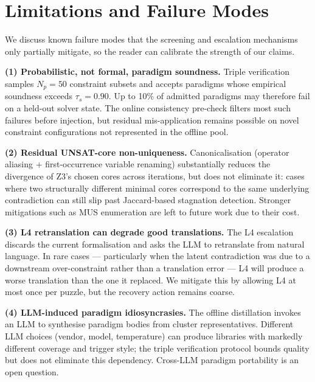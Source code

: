 
\section{Limitations and Failure Modes}
\label{sec:limitations}

We discuss known failure modes that the screening and escalation mechanisms only partially mitigate, so the reader can calibrate the strength of our claims.

\textbf{(1) Probabilistic, not formal, paradigm soundness.} Triple verification samples $N_p = 50$ constraint subsets and accepts paradigms whose empirical soundness exceeds $\tau_s = 0.90$. Up to 10\% of admitted paradigms may therefore fail on a held-out solver state. The online consistency pre-check filters most such failures before injection, but residual mis-application remains possible on novel constraint configurations not represented in the offline pool.

\textbf{(2) Residual UNSAT-core non-uniqueness.} Canonicalisation (operator aliasing + first-occurrence variable renaming) substantially reduces the divergence of Z3's chosen cores across iterations, but does not eliminate it: cases where two structurally different minimal cores correspond to the same underlying contradiction can still slip past Jaccard-based stagnation detection. Stronger mitigations such as MUS enumeration are left to future work due to their cost.

\textbf{(3) L4 retranslation can degrade good translations.} The L4 escalation discards the current formalisation and asks the LLM to retranslate from natural language. In rare cases — particularly when the latent contradiction was due to a downstream over-constraint rather than a translation error — L4 will produce a worse translation than the one it replaced. We mitigate this by allowing L4 at most once per puzzle, but the recovery action remains coarse.

\textbf{(4) LLM-induced paradigm idiosyncrasies.} The offline distillation invokes an LLM to synthesise paradigm bodies from cluster representatives. Different LLM choices (vendor, model, temperature) can produce libraries with markedly different coverage and trigger style; the triple verification protocol bounds quality but does not eliminate this dependency. Cross-LLM paradigm portability is an open question.

